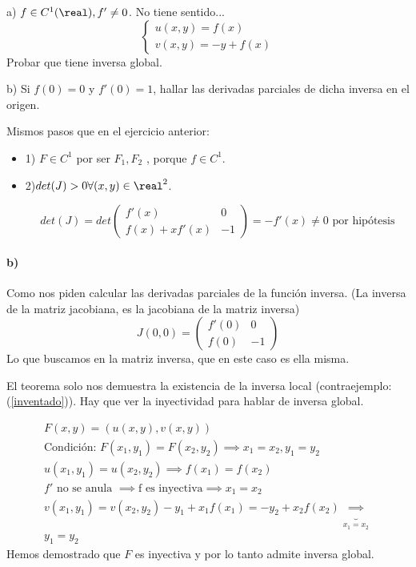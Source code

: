  \begin{problem}[5]
 a)
 $f\in C^1(\real), f'\neq0$.
 No tiene sentido...
 $$\left\{\begin{matrix} u(x,y) =f(x)\\v(x,y) = -y + f(x)\end{matrix}\right.$$
 Probar que tiene inversa global.
 
 b) Si $f (0) = 0$ y $f' (0) = 1$, hallar las derivadas parciales de dicha inversa en el origen.

\solution

 Mismos pasos que en el ejercicio anterior:
 \begin{itemize}
 \item 1) $F \in C^1$ por ser $F_1,F_2$ , porque $f\in C^1$.
 \item 2)$det(J)>0 \forall (x,y)\in \real^2$.
 
 $$det(J) = det\begin{pmatrix} f'(x)&0\\f(x)+xf'(x)&-1\end{pmatrix} = -f'(x) \neq 0\text{ por hipótesis}$$
 \end{itemize}
 \paragraph{b)}
 Como nos piden calcular las derivadas parciales de la función inversa. (La inversa de la matriz jacobiana, es la jacobiana de la matriz inversa)
 $$J(0,0) = \begin{pmatrix}f'(0) & 0 \\f(0) & -1\end{pmatrix}$$
 Lo que buscamos en la matriz inversa, que en este caso es ella misma.
 
 El teorema solo nos demuestra la existencia de la inversa local (contraejemplo:(\ref{inventado})). Hay que ver la inyectividad para hablar de inversa global.
 
\begin{gather*}
F(x,y) = (u(x,y),v(x,y))\\
\text{Condición: }F(x_1,y_1) = F(x_2,y_2) \implies x_1=x_2, y_1=y_2\\
u(x_1,y_1) = u(x_2,y_2) \implies f(x_1) = f(x_2)\\
f' \text{ no se anula } \implies \text{f es inyectiva} \implies x_1=x_2\\
v(x_1,y_1) = v(x_2,y_2) -y_1 + x_1f(x_1) = -y_2 + x_2f(x_2) \underbrace{\implies}_{x_1=x_2}\\
y_1=y_2
\end{gather*}
Hemos demostrado que $F$ es inyectiva y por lo tanto admite inversa global.
 
\end{problem}
